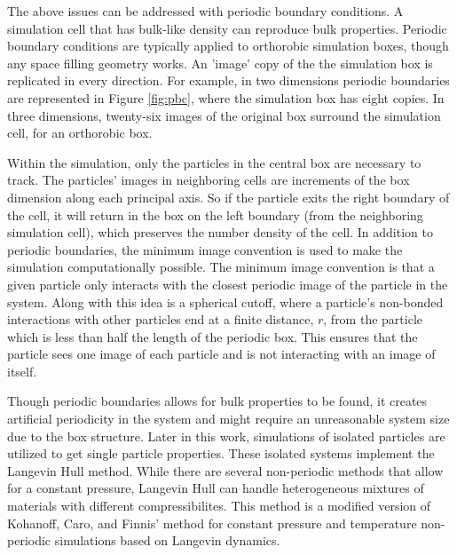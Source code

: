 The above issues can be addressed with periodic boundary conditions. A simulation cell that has bulk-like density can reproduce bulk properties. Periodic boundary conditions are typically applied to orthorobic simulation boxes, though any space filling geometry works. An 'image' copy of the the simulation box is replicated in every direction. For example, in two dimensions periodic boundaries are represented in Figure \ref{fig:pbc}, where the simulation box has eight copies. In three dimensions, twenty-six images of the original box surround the simulation cell, for an orthorobic box.
    
Within the simulation, only the particles in the central box are necessary to track. The particles' images in neighboring cells are increments of the box dimension along each principal axis. 
So if the particle exits the right boundary of the cell, it will return in the box on the left boundary (from the neighboring simulation cell), which preserves the number density of the cell. 
In addition to periodic boundaries, the minimum image convention is used to make the simulation computationally possible. The minimum image convention is that a given particle only interacts with the closest periodic image of the particle in the system. 
Along with this idea is a spherical cutoff, where a particle's non-bonded interactions with other particles end at a finite distance, $r$, from the particle which is less than half the length of the periodic box. This ensures that the particle sees one image of each particle and is not interacting with an image of itself. 

Though periodic boundaries allows for bulk properties to be found, it creates artificial periodicity in the system and might require an unreasonable system size due to the box structure. Later in this work, simulations of isolated particles are utilized to get single particle properties. 
These isolated systems implement the Langevin Hull method. While there are several non-periodic methods that allow for a constant pressure, Langevin Hull can handle heterogeneous mixtures of materials with different compressibilites.\cite{Vardeman2011} This method is a modified version of Kohanoff, Caro, and Finnis' method for constant pressure and temperature non-periodic simulations based on Langevin dynamics.\cite{Kohanoff:2005qm, Baltazar:2006ru} 

